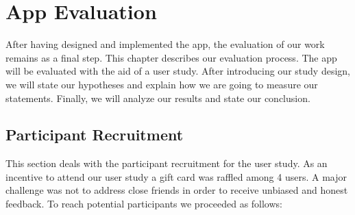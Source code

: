 \section{App Evaluation}
\label{s:evaluation}
After having designed and implemented the app, the evaluation of our work remains as a final step. This chapter describes our evaluation process.
 The app will be evaluated with the aid of a user study.
 After introducing our study design, we will state our hypotheses and explain how we are going to measure our statements.
 Finally, we will analyze our results and state our conclusion.


\subsection{Participant Recruitment}
\label{s:participant_recruitment}
This section deals with the participant recruitment for the user study.
As an incentive to attend our user study a gift card was raffled among 4 users.
A major challenge was not to address close friends in order to receive unbiased and honest feedback. 
To reach potential participants we proceeded as follows:

